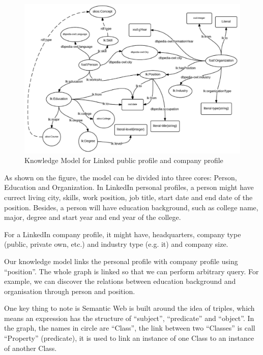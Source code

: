 \begin{figure}[H]
	\centering
	\includegraphics[width=1.0\textwidth]{images/knowledge-model.png}
	\caption{Knowledge Model for Linked public profile and company profile\protect}
	\label{fig:KnowledgeModel}
\end{figure}

As shown on the figure, the model can be divided into three cores: Person, Education and Organization. In LinkedIn personal profiles, a person might have currect living city, skills, work position, job title, start date and end date of the position. Besides, a person will have education background, such as college name, major, degree and start year and end year of the college.

For a LinkedIn company profile, it might have, headquarters, company type (public, private own, etc.) and industry type (e.g. \gls{it}) and company size.

Our knowledge model links the personal profile with company profile using ``position''. The whole graph is linked so that we can perform arbitrary query. For example, we can discover the relations between education background and organisation through person and position.

One key thing to note is Semantic Web is built around the idea of triples, which means an expression has the structure of ``subject'', ``predicate'' and ``object''. In the graph, the names in circle are ``Class'', the link between two ``Classes'' is call ``Property'' (predicate), it is used to link an instance of one Class to an instance of another Class.

